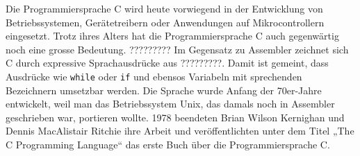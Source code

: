 Die Programmiersprache C wird heute vorwiegend in der Entwicklung von Betriebssystemen, Gerätetreibern oder Anwendungen auf Mikrocontrollern eingesetzt. Trotz ihres Alters hat die Programmiersprache C auch gegenwärtig noch eine grosse Bedeutung. ????????? Im Gegensatz zu Assembler zeichnet sich C durch expressive Sprachausdrücke aus ?????????. Damit ist gemeint, dass Ausdrücke wie \texttt{while} oder \texttt{if} und ebensos Variabeln mit sprechenden Bezeichnern umsetzbar werden. Die Sprache wurde Anfang der 70er-Jahre entwickelt, weil man das Betriebssystem Unix, das damals noch in Assembler geschrieben war, portieren wollte. 1978 beendeten Brian Wilson Kernighan und Dennis MacAlistair Ritchie ihre Arbeit und veröffentlichten unter dem Titel „The C Programming Language“ das erste Buch über die Programmiersprache C.



